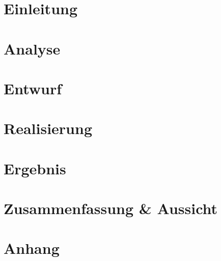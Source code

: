 \documentclass[a4paper, 12pt, parskip=half]{scrbook}
\title{\thesisTitle}
\author{\thesisAuthor}
\date{\today{}}
\begin{document}
	\frontmatter
	
	
	\cleardoublepage
	\pagestyle{scrheadings}
	
	\tableofcontents	

	
	\mainmatter
	
	\rofoot{\textbf{\headmark~~$\mid$~~\pagemark}}
	
	\chapter{Einleitung}
	
	\chapter{Analyse}
	
	\chapter{Entwurf}
	
	\chapter{Realisierung}
	
	\chapter{Ergebnis}
	
	\chapter{Zusammenfassung \& Aussicht}
	
	\backmatter 
	\rofoot{\textbf{$\mid$~~\pagemark}}
	\lefoot{\textbf{\pagemark~~$\mid$}}
	\chapter{Anhang}
	
	\listoffigures
	
	\listoftables
	
	\printbibliography
	 
	\printindex
	
\end{document}
